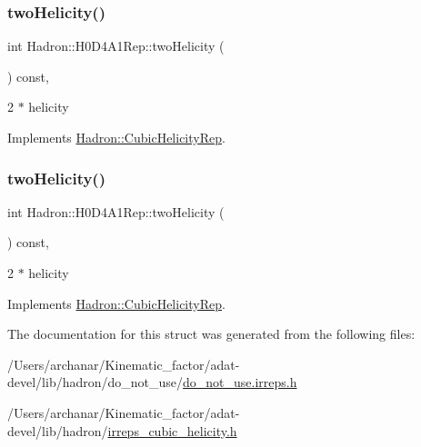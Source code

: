 \subsubsection{\texorpdfstring{twoHelicity()}{twoHelicity()}\hspace{0.1cm}{\footnotesize\ttfamily [2/3]}}
{\footnotesize\ttfamily int Hadron\+::\+H0\+D4\+A1\+Rep\+::two\+Helicity (\begin{DoxyParamCaption}{ }\end{DoxyParamCaption}) const\hspace{0.3cm}{\ttfamily [inline]}, {\ttfamily [virtual]}}

2 $\ast$ helicity 

Implements \mbox{\hyperlink{structHadron_1_1CubicHelicityRep_af507aa56fc2747eacc8cb6c96db31ecc}{Hadron\+::\+Cubic\+Helicity\+Rep}}.

\mbox{\label{structHadron_1_1H0D4A1Rep_a2aa89f84616ec32830d7b607b5a0b513}} 
\subsubsection{\texorpdfstring{twoHelicity()}{twoHelicity()}\hspace{0.1cm}{\footnotesize\ttfamily [3/3]}}
{\footnotesize\ttfamily int Hadron\+::\+H0\+D4\+A1\+Rep\+::two\+Helicity (\begin{DoxyParamCaption}{ }\end{DoxyParamCaption}) const\hspace{0.3cm}{\ttfamily [inline]}, {\ttfamily [virtual]}}

2 $\ast$ helicity 

Implements \mbox{\hyperlink{structHadron_1_1CubicHelicityRep_af507aa56fc2747eacc8cb6c96db31ecc}{Hadron\+::\+Cubic\+Helicity\+Rep}}.



The documentation for this struct was generated from the following files\+:\begin{DoxyCompactItemize}
\item 
/\+Users/archanar/\+Kinematic\+\_\+factor/adat-\/devel/lib/hadron/do\+\_\+not\+\_\+use/\mbox{\hyperlink{adat-devel_2lib_2hadron_2do__not__use_2do__not__use_8irreps_8h}{do\+\_\+not\+\_\+use.\+irreps.\+h}}\item 
/\+Users/archanar/\+Kinematic\+\_\+factor/adat-\/devel/lib/hadron/\mbox{\hyperlink{adat-devel_2lib_2hadron_2irreps__cubic__helicity_8h}{irreps\+\_\+cubic\+\_\+helicity.\+h}}\end{DoxyCompactItemize}
